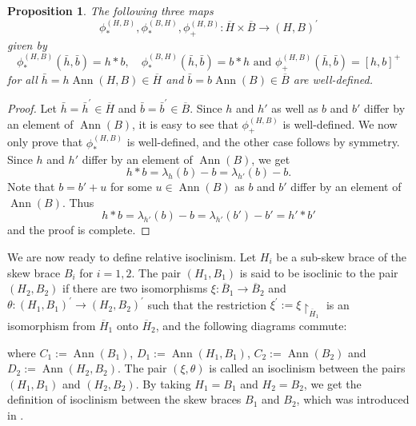 \documentclass[10pt,a4paper]{amsart}
\numberwithin{equation}{section}
\newtheorem{pro}[equation]{Proposition}
\newcommand{\Ann}{\operatorname{Ann} }
\begin{document}
\begin{pro}
      The following three maps 
      $${\phi_\ast^{(H,B)}},{\phi_\ast^{(B,H)}},{\phi_+^{(H,B)}}:{\overline{H}}\times {\overline{B}}\rightarrow(H,B)^\prime$$
      given by 
      $${\phi_\ast^{(H,B)}}(\bar{h},\bar{b})=h\ast b, \quad {\phi_\ast^{(B,H)}}(\bar{h},\bar{b})=b\ast h \mbox{ and } {\phi_+^{(H,B)}}(\bar{h},\bar{b})=[h,b]^+$$ 
      for all $\bar{h}=h \Ann{(H,B)}\in {\overline{H}}$ and  $\bar{b}=b \Ann{(B)}\in {\overline{B}}$  are well-defined. 
\end{pro}
\begin{proof}
      Let $\bar{h} = \bar{h}^\prime \in {\overline{H}}$ and $\bar{b} = \bar{b}^\prime \in {\overline{B}}$. Since $h$ and $h'$ as well as $b$ and $b'$ differ by an element of $\Ann(B)$, it is easy to see that
     ${\phi_+^{(H,B)}}$ is well-defined. We now only prove that 
  ${\phi_\ast^{(H,B)}}$ is well-defined, and the other case follows by symmetry. Since $h$ and $h'$ differ by an element of $\Ann(B)$, we get 
$$
h*b = \lambda_h(b) - b = \lambda_{h'}(b) - b.
$$
Note that $b = b' +u$ for some $u \in \Ann(B)$ as $b$ and $b'$ differ by an element of $\Ann(B)$. Thus 
$$h*b = \lambda_{h'}(b) - b = \lambda_{h'}(b') - b' = h' * b'$$
and the proof is complete.
\end{proof}

We are now ready to define relative isoclinism.
      Let $H_i$ be a sub-skew brace of the skew brace $B_i$ for $i = 1, 2$. 
      The pair $(H_1,B_1)$ is said to be isoclinic to the pair $(H_2,B_2)$
 if there are two isomorphisms $\xi:\overline{B}_1\rightarrow \overline{B}_2$ and $\theta:(H_1,B_1)^\prime\rightarrow (H_2,B_2)^\prime$ such that the restriction $\xi^\prime:=\xi{\restriction}_{\overline{H}_1}$ is an isomorphism from $\overline{H}_1$ onto $\overline{H}_2$, and the following diagrams commute:
\begin{center} %
\end{center}
where $C_1:=\Ann{(B_1)}$, $D_1 := \Ann{(H_1,B_1)}$, $C_2:=\Ann{(B_2)}$ and $D_2:= \Ann{(H_2,B_2)}$. The pair $(\xi,\theta)$ is called an isoclinism between the pairs $(H_1,B_1)$ and $(H_2,B_2)$. By taking $H_1 = B_1$ and $H_2 = B_2$, we get the definition of isoclinism between the skew braces $B_1$ and $B_2$, which was introduced in \cite{LV24}.
\end{document}
